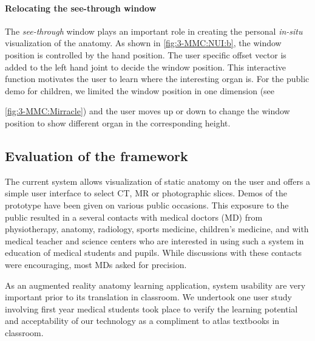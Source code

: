 {{{{{\paragraph{Relocating the see-through window}
The \textit{see-through} window plays an important role in creating the personal \textit{in-situ} visualization of the anatomy.
As shown in \figurename{\ref{fig:3-MMC:NUI:b}}, the window position is controlled by the hand position. The user specific offset vector is added to the left hand joint to decide the window position. This interactive function motivates the user to learn where the interesting organ is. For the public demo for children, we limited the window position in one dimension (see \figurename{\ref{fig:3-MMC:Mirracle}) and the user moves up or down to change the window position to show different organ in the corresponding height.
	
\subsection{Evaluation of the framework}
The current system allows visualization of static anatomy on the user and offers a simple user interface to select CT, MR or photographic slices. Demos of the prototype have been given on various public occasions. This exposure to the public resulted in a several contacts with medical doctors (MD) from physiotherapy, anatomy, radiology, sports medicine, children's medicine, and with medical teacher and science centers who are interested in using such a system in education of medical students and pupils. While discussions with these contacts were encouraging, most MDs asked for precision.

As an augmented reality anatomy learning application, system usability are very important prior to its translation in classroom. We undertook one user study involving first year medical students took place to verify the learning potential and acceptability of our technology as a compliment to atlas textbooks in classroom.

}}}}}}
